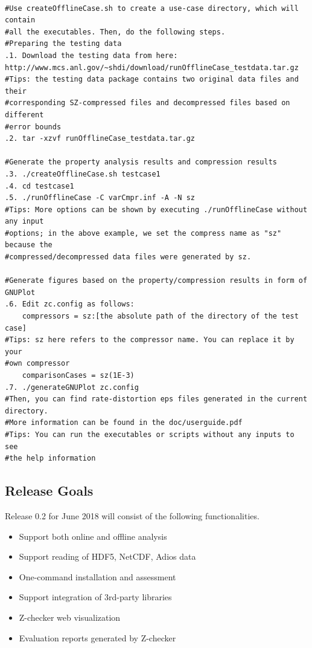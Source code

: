 \begin{lstlisting}[style=ShellStyleInline, basicstyle =\footnotesize\ttfamily]

#Use createOfflineCase.sh to create a use-case directory, which will contain 
#all the executables. Then, do the following steps.
#Preparing the testing data
.1. Download the testing data from here:
http://www.mcs.anl.gov/~shdi/download/runOfflineCase_testdata.tar.gz
#Tips: the testing data package contains two original data files and their 
#corresponding SZ-compressed files and decompressed files based on different 
#error bounds
.2. tar -xzvf runOfflineCase_testdata.tar.gz

#Generate the property analysis results and compression results
.3. ./createOfflineCase.sh testcase1
.4. cd testcase1
.5. ./runOfflineCase -C varCmpr.inf -A -N sz
#Tips: More options can be shown by executing ./runOfflineCase without any input 
#options; in the above example, we set the compress name as "sz" because the 
#compressed/decompressed data files were generated by sz.

#Generate figures based on the property/compression results in form of GNUPlot
.6. Edit zc.config as follows:
    compressors = sz:[the absolute path of the directory of the test case]
#Tips: sz here refers to the compressor name. You can replace it by your 
#own compressor
    comparisonCases = sz(1E-3)
.7. ./generateGNUPlot zc.config
#Then, you can find rate-distortion eps files generated in the current directory.
#More information can be found in the doc/userguide.pdf
#Tips: You can run the executables or scripts without any inputs to see 
#the help information
\end{lstlisting}

\subsection{Release Goals}
Release 0.2 for June 2018 will consist of the following functionalities.

\begin{itemize}
  \item Support both online and offline analysis
  \item Support reading of HDF5, NetCDF, Adios data
  \item One-command installation and assessment
  \item Support integration of 3rd-party libraries
  \item Z-checker web visualization
  \item Evaluation reports generated by Z-checker
\end{itemize}
